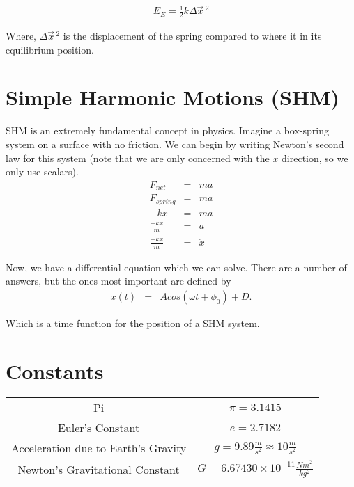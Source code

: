 \documentclass{article}
\begin{document}
\begin{eqnarray}
    E_E = \frac{1}{2} k \Delta \vec{x} \, ^2
\end{eqnarray}

\noindent Where, $\Delta \vec{x} \, ^2$ is the displacement of the spring
compared to where it in its equilibrium position.

\newpage

\newpage
\section{Simple Harmonic Motions (SHM)}
SHM is an extremely fundamental concept in physics. Imagine a box-spring system on a surface with no friction. We can begin by writing Newton's
second law for this system (note that we are only concerned with the $x$ direction, so we only use scalars).
\begin{eqnarray*}
    F_{net} &=& ma \\
    F_{spring} &=& ma \\
    -kx &=& ma \\
    \frac{-kx}{m} &=& a \\
    \frac{-kx}{m} &=& \ddot{x}
\end{eqnarray*}

Now, we have a differential equation which we can solve. There are a number of answers, but the ones most important are defined by
\begin{eqnarray} \label{eq : SHM}
    x(t) &=& Acos(\omega t + \phi_0) + D.
\end{eqnarray}

Which is a time function for the position of a SHM system. 

\newpage
\appendix

\section{Constants}\label{Appendix A}

\begin{center}
\begin{tabular}{c | c}
    Pi & $\pi = 3.1415$\\
    Euler's Constant & $e = 2.7182$ \\
    Acceleration due to Earth's Gravity & $g = 9.89 \frac{m}{s^2} \approx 10 \frac{m}{s^2}$ \\
    Newton's Gravitational Constant & $G = 6.67430 \times 10^{-11} \frac{Nm^2}{kg^2}$ \\
\end{tabular}
\end{center}
\end{document}

